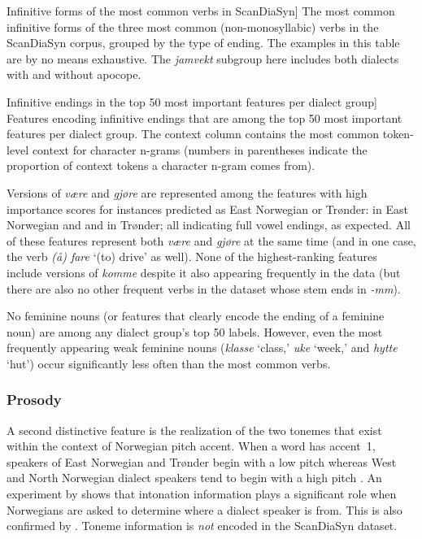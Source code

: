 \begin{table}[htbp]
    
    \caption
    [Infinitive forms of the most common verbs in ScanDiaSyn]
    {The most common infinitive forms of the three most common (non-monosyllabic) verbs in the ScanDiaSyn corpus, grouped by the type of ending.
    The examples in this table are by no means exhaustive.
    The \textit{jamvekt} subgroup here includes both dialects with and without apocope.}
    \label{tab:jamvekt}
\end{table}
\begin{table}[htbp]
    
    \caption
    [Infinitive endings in the top 50 most important features per dialect group]
    {Features encoding infinitive endings that are among the top 50 most important features per dialect group.
    The context column contains the most common token-level context for character n-grams (numbers in parentheses indicate the proportion of context tokens a character n-gram comes from).}
    \label{tab:results-inf}
\end{table}

Versions of \textit{være} and \textit{gjøre} are represented among the features with high importance scores for instances predicted as East Norwegian or Trønder:  in East Norwegian and  and  in Tr\o{}nder; all indicating full vowel endings, as expected.
All of these features represent both \textit{være} and \textit{gjøre} at the same time (and in one case, the verb \textit{(å) fare} `(to) drive' as well).
None of the highest-ranking features include versions of \textit{komme} despite it also appearing frequently in the data (but there are also no other frequent verbs in the dataset whose stem ends in \textit{-mm}).

No feminine nouns (or features that clearly encode the ending of a feminine noun) are among any dialect group's top 50 labels.
However, even the most frequently appearing weak feminine nouns (\textit{klasse} `class,' \textit{uke} `week,' and \textit{hytte} `hut') occur significantly less often than the most common verbs.

\subsubsection{Prosody}
\label{sec:dialects-prosody}

A second distinctive feature is the realization of the two tonemes that exist within the context of Norwegian pitch accent.
When a word has accent~1, speakers of East Norwegian and Trønder begin with a low pitch whereas West and North Norwegian dialect speakers tend to begin with a high pitch \cite[p.~37]{maehlum2012dialektlandskapet}.
An experiment by \citet{gooskens2005norwegians} shows that intonation information plays a significant role when Norwegians are asked to determine where a dialect speaker is from.
This is also confirmed by \citet{ommeren2019tonefall}.
Toneme information is \textit{not} encoded in the ScanDiaSyn dataset.

